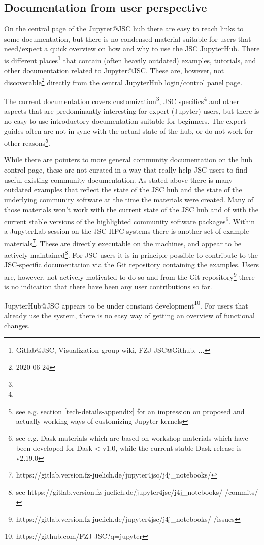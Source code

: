 
\subsection{Documentation from user perspective}
\label{s-doc-from-user-pov}

On the central page of the Jupyter@JSC hub there are easy to reach links to some documentation, but there is no condensed material suitable for users that need/expect a quick overview on how and why to use the JSC JupyterHub.
There is different places\footnote{Gitlab@JSC, Visualization group wiki, FZJ-JSC@Github, ...} that contain (often heavily outdated) examples, tutorials, and other documentation related to Jupyter@JSC.
These are, however, not discoverable\footnote{2020-06-24} directly from the central JupyterHub login/control panel page.

The current documentation covers customization\footnote{}, JSC specifics\footnote{} and other aspects that are predominantly interesting for expert (Jupyter) users, but there is no easy to use introductory documentation suitable for beginners.
The expert guides often are not in sync with the actual state of the hub, or do not work for other reasons\footnote{see e.g. section \ref{tech-details-appendix} for an impression on proposed and actually working ways of customizing Jupyter kernels}.

While there are pointers to more general community documentation on the hub control page, these are not curated in a way that really help JSC users to find useful existing community documentation.
As stated above there is many outdated examples that reflect the state of the JSC hub and the state of the underlying community software at the time the materials were created.
Many of those materials won't work with the current state of the JSC hub and of with the current stable versions of the highlighted community software packages\footnote{see e.g. Dask materials which are based on workshop materials which have been developed for Dask < v1.0, while the current stable Dask release is v2.19.0}.
Within a JupyterLab session on the JSC HPC systems there is another set of example materials\footnote{https://gitlab.version.fz-juelich.de/jupyter4jsc/j4j_notebooks/}.
These are directly executable on the machines, and appear to be actively maintained\footnote{see https://gitlab.version.fz-juelich.de/jupyter4jsc/j4j_notebooks/-/commits/}.
For JSC users it is in principle possible to contribute to the JSC-specific documentation via the Git repository containing the examples.
Users are, however, not actively motivated to do so and from the Git repository\footnote{https://gitlab.version.fz-juelich.de/jupyter4jsc/j4j_notebooks/-/issues} there is no indication that there have been any user contributions so far.

JupyterHub@JSC appears to be under constant development\footnote{https://github.com/FZJ-JSC?q=jupyter}.
For users that already use the system, there is no easy way of getting an overview of functional changes.
